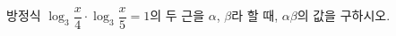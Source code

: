 방정식 $\log_3 \dfrac{x}{4}\cdot\log_3 \dfrac{x}{5}=1$의 두 근을 $\alpha$, $\beta$라 할 때, $\alpha\beta$의 값을 구하시오.
